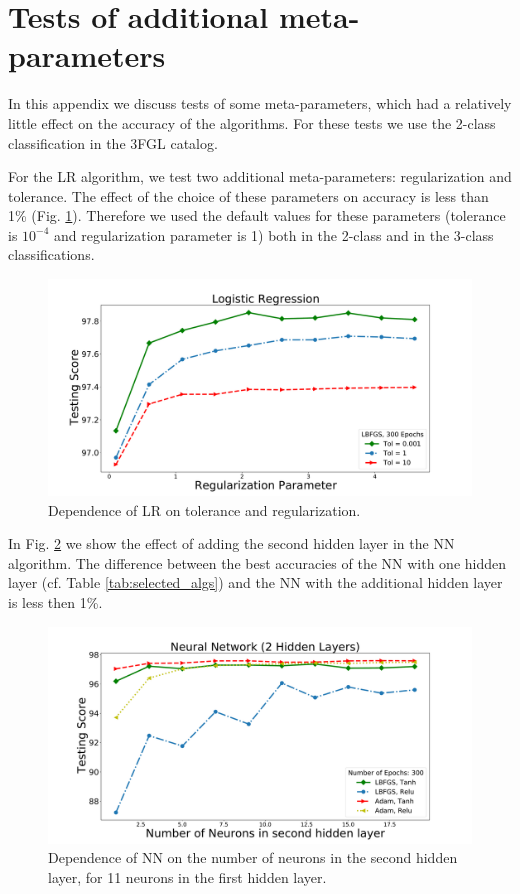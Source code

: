 \section{Tests of additional meta-parameters}

In this appendix we discuss tests of some meta-parameters, which had a relatively little effect on the 
accuracy of the algorithms. For these tests we use the 2-class classification in the 3FGL catalog.

For the LR algorithm, we test two additional meta-parameters: regularization and tolerance. 
The effect of the choice of these parameters on accuracy is less than 1\% (Fig. \ref{fig:LR_tol_reg}). 
Therefore we used the default values for these parameters (tolerance is $10^{-4}$ and regularization parameter is 1)
both in the 2-class and in the 3-class classifications.

\begin{figure}[h]
\centering
\includegraphics[width=\twopicsp\textwidth]{plots/lr_train_reg.pdf}
\caption{Dependence of LR on tolerance and regularization. 
}
\label{fig:LR_tol_reg}
\end{figure}

In Fig. \ref{fig:nn_nn} we show the effect of adding the second hidden layer in the NN algorithm.
The difference between the best accuracies of the NN with one hidden layer (cf. Table \ref{tab:selected_algs})
and  the NN with the additional hidden layer is less then 1\%.
\begin{figure}[h]
\centering
\includegraphics[width=\twopicsp\textwidth]{plots/nn_2layers_3fgl.pdf}
\caption{Dependence of NN on the number of neurons in the second hidden layer, for 11 neurons in the first hidden layer.
}
\label{fig:nn_nn}
\end{figure}


